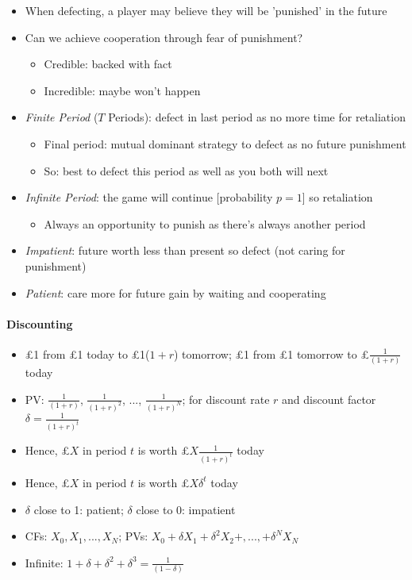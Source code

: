 \documentclass[11pt, english]{article}
\begin{document}
	\begin{itemize}                                         
        \setlength\itemsep{0cm}
		\item When defecting, a player may believe they will be 'punished' in the future
		\item Can we achieve cooperation through fear of punishment?
		\begin{itemize}
			\item Credible: backed with fact
			\item Incredible: maybe won't happen 
		\end{itemize}
		\item \textit{Finite Period} ($T$ Periods): defect in last period as no more time for retaliation
		\begin{itemize}
			\item Final period: mutual dominant strategy to defect as no future punishment 
			\item So: best to defect this period as well as you both will next
		\end{itemize}
		\item \textit{Infinite Period}: the game will continue [probability $p=1$] so retaliation 
		\begin{itemize}
			\item Always an opportunity to punish as there's always another period
		\end{itemize}
		\item \textit{Impatient}: future worth less than present so defect (not caring for punishment)
		\item \textit{Patient}: care more for future gain by waiting and cooperating
	\end{itemize}
		
		\paragraph{Discounting}

	\begin{itemize}
	\setlength\itemsep{0cm}
		\item \pounds1 from \pounds1 today to \pounds1($1+r$) tomorrow; \pounds1 from \pounds1 tomorrow to \pounds$\frac{1}{(1+r)}$ today
		\item PV: $\frac{1}{(1+r)}$, $\frac{1}{(1+r)^2}$, ..., $\frac{1}{(1+r)^N}$; for discount rate $r$ and discount factor $\delta=\frac{1}{(1+r)^t}$
		\item Hence, \pounds$X$ in period $t$ is worth \pounds$X\frac{1}{(1+r)^t}$ today
		\item Hence, \pounds$X$ in period $t$ is worth \pounds$X\delta^t$ today
		\item $\delta$ close to 1: patient; $\delta$ close to 0: impatient
		\item CFs: $X_0,X_1,...,X_N$; PVs: $X_0+\delta X_1+\delta^2X_2+,...,+\delta^NX_N$
		\item Infinite: $1+\delta+\delta^2+\delta^3=\frac{1}{(1-\delta)}$
	\end{itemize}
\end{document}
